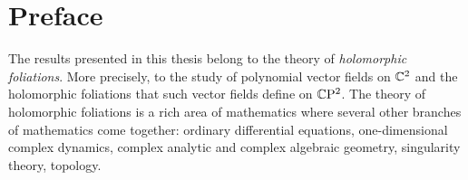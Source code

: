 \documentclass[phd,tocprelim]{cornell}
\begin{document}




\hypersetup{linkcolor=black} %
\cleardoublepage{}
\contentspage
\hypersetup{linkcolor=red}


\cleardoublepage{}
{}
\chapter*{Preface}

The results presented in this thesis belong to the theory of \textit{holomorphic foliations}. More precisely, to the study of polynomial vector fields on $\mathbb{C}^2$ and the holomorphic foliations that such vector fields define on $\mathbb{C}\mathrm{P}^2$. The theory of holomorphic foliations is a rich area of mathematics where several other branches of mathematics come together: ordinary differential equations, one-dimensional complex dynamics, complex analytic and complex algebraic geometry, singularity theory, topology. 
\end{document}
